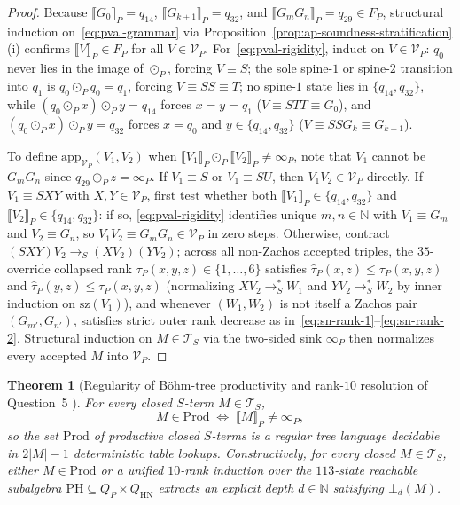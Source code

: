 \documentclass[11pt,reqno]{amsart}
\numberwithin{equation}{section}
\theoremstyle{plain}
\newtheorem{theorem}{Theorem}[section]
\theoremstyle{definition}
\theoremstyle{remark}
\newcommand{\TS}{\mathcal{T}_S}
\newcommand{\HN}{\mathrm{HN}}
\newcommand{\Prod}{\mathrm{Prod}}
\newcommand{\sem}[1]{\llbracket #1 \rrbracket}
\newcommand{\redS}{\to_S}
\newcommand{\redSs}{\to_S^*}
\begin{document}
\begin{proof}
Because $\sem{G_0}_P = q_{14}$, $\sem{G_{k+1}}_P = q_{32}$, and $\sem{G_m G_n}_P = q_{29} \in F_P$, structural induction on~\eqref{eq:pval-grammar} via Proposition~\ref{prop:ap-soundness-stratification}(i) confirms $\sem{V}_P \in F_P$ for all $V \in \mathcal{V}_P$. For~\eqref{eq:pval-rigidity}, induct on $V \in \mathcal{V}_P$: $q_0$ never lies in the image of $\odot_P$, forcing $V \equiv S$; the sole spine-$1$ or spine-$2$ transition into $q_1$ is $q_0 \odot_P q_0 = q_1$, forcing $V \equiv S S \equiv T$; no spine-$1$ state lies in $\{q_{14}, q_{32}\}$, while $(q_0 \odot_P x) \odot_P y = q_{14}$ forces $x = y = q_1$ ($V \equiv S T T \equiv G_0$), and $(q_0 \odot_P x) \odot_P y = q_{32}$ forces $x = q_0$ and $y \in \{q_{14}, q_{32}\}$ ($V \equiv S S G_k \equiv G_{k+1}$).

To define $\mathrm{app}_{\mathcal{V}_P}(V_1, V_2)$ when $\sem{V_1}_P \odot_P \sem{V_2}_P \neq \infty_P$, note that $V_1$ cannot be $G_m G_n$ since $q_{29} \odot_P z = \infty_P$. If $V_1 \equiv S$ or $V_1 \equiv S U$, then $V_1 V_2 \in \mathcal{V}_P$ directly. If $V_1 \equiv S X Y$ with $X, Y \in \mathcal{V}_P$, first test whether both $\sem{V_1}_P \in \{q_{14}, q_{32}\}$ and $\sem{V_2}_P \in \{q_{14}, q_{32}\}$: if so, \eqref{eq:pval-rigidity} identifies unique $m, n \in \mathbb{N}$ with $V_1 \equiv G_m$ and $V_2 \equiv G_n$, so $V_1 V_2 \equiv G_m G_n \in \mathcal{V}_P$ in zero steps. Otherwise, contract $(S X Y) V_2 \redS (X V_2)(Y V_2)$; across all non-Zachos accepted triples, the $35$-override collapsed rank $\tau_P(x, y, z) \in \{1, \dots, 6\}$ satisfies $\hat{\tau}_P(x, z) \le \tau_P(x, y, z)$ and $\hat{\tau}_P(y, z) \le \tau_P(x, y, z)$ (normalizing $X V_2 \redSs W_1$ and $Y V_2 \redSs W_2$ by inner induction on $\mathrm{sz}(V_1)$), and whenever $(W_1, W_2)$ is not itself a Zachos pair $(G_{m'}, G_{n'})$, satisfies strict outer rank decrease as in~\eqref{eq:sn-rank-1}--\eqref{eq:sn-rank-2}. Structural induction on $M \in \TS$ via the two-sided sink $\infty_P$ then normalizes every accepted $M$ into $\mathcal{V}_P$.
\end{proof}

\begin{theorem}[Regularity of B\"ohm-tree productivity and rank-$10$ resolution of Question~5 {\cite[p.~80]{BarendregtEndrullisKlopWaldmann2017}}]\label{thm:q5-main}
For every closed $S$-term $M \in \TS$,
\begin{equation}\label{eq:q5-iff}
M \in \Prod \;\Longleftrightarrow\; \sem{M}_P \neq \infty_P,
\end{equation}
so the set $\Prod$ of productive closed $S$-terms is a regular tree language decidable in $2|M| - 1$ deterministic table lookups. Constructively, for every closed $M \in \TS$, either $M \in \Prod$ or a unified $10$-rank induction over the $113$-state reachable subalgebra $\mathrm{PH} \subseteq Q_P \times Q_{\HN}$ extracts an explicit depth $d \in \mathbb{N}$ satisfying $\bot_d(M)$.
\end{theorem}
\end{document}
